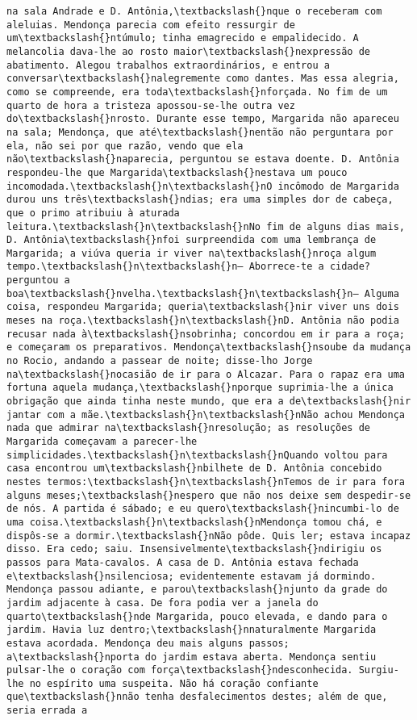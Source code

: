\begin{Verbatim}[commandchars=\\\{\}]
na sala Andrade e D. Antônia,\textbackslash{}nque o receberam com aleluias. Mendonça parecia com efeito ressurgir de um\textbackslash{}ntúmulo; tinha emagrecido e empalidecido. A melancolia dava-lhe ao rosto maior\textbackslash{}nexpressão de abatimento. Alegou trabalhos extraordinários, e entrou a conversar\textbackslash{}nalegremente como dantes. Mas essa alegria, como se compreende, era toda\textbackslash{}nforçada. No fim de um quarto de hora a tristeza apossou-se-lhe outra vez do\textbackslash{}nrosto. Durante esse tempo, Margarida não apareceu na sala; Mendonça, que até\textbackslash{}nentão não perguntara por ela, não sei por que razão, vendo que ela não\textbackslash{}naparecia, perguntou se estava doente. D. Antônia respondeu-lhe que Margarida\textbackslash{}nestava um pouco incomodada.\textbackslash{}n\textbackslash{}nO incômodo de Margarida durou uns três\textbackslash{}ndias; era uma simples dor de cabeça, que o primo atribuiu à aturada leitura.\textbackslash{}n\textbackslash{}nNo fim de alguns dias mais, D. Antônia\textbackslash{}nfoi surpreendida com uma lembrança de Margarida; a viúva queria ir viver na\textbackslash{}nroça algum tempo.\textbackslash{}n\textbackslash{}n— Aborrece-te a cidade? perguntou a boa\textbackslash{}nvelha.\textbackslash{}n\textbackslash{}n— Alguma coisa, respondeu Margarida; queria\textbackslash{}nir viver uns dois meses na roça.\textbackslash{}n\textbackslash{}nD. Antônia não podia recusar nada à\textbackslash{}nsobrinha; concordou em ir para a roça; e começaram os preparativos. Mendonça\textbackslash{}nsoube da mudança no Rocio, andando a passear de noite; disse-lho Jorge na\textbackslash{}nocasião de ir para o Alcazar. Para o rapaz era uma fortuna aquela mudança,\textbackslash{}nporque suprimia-lhe a única obrigação que ainda tinha neste mundo, que era a de\textbackslash{}nir jantar com a mãe.\textbackslash{}n\textbackslash{}nNão achou Mendonça nada que admirar na\textbackslash{}nresolução; as resoluções de Margarida começavam a parecer-lhe simplicidades.\textbackslash{}n\textbackslash{}nQuando voltou para casa encontrou um\textbackslash{}nbilhete de D. Antônia concebido nestes termos:\textbackslash{}n\textbackslash{}nTemos de ir para fora alguns meses;\textbackslash{}nespero que não nos deixe sem despedir-se de nós. A partida é sábado; e eu quero\textbackslash{}nincumbi-lo de uma coisa.\textbackslash{}n\textbackslash{}nMendonça tomou chá, e dispôs-se a dormir.\textbackslash{}nNão pôde. Quis ler; estava incapaz disso. Era cedo; saiu. Insensivelmente\textbackslash{}ndirigiu os passos para Mata-cavalos. A casa de D. Antônia estava fechada e\textbackslash{}nsilenciosa; evidentemente estavam já dormindo. Mendonça passou adiante, e parou\textbackslash{}njunto da grade do jardim adjacente à casa. De fora podia ver a janela do quarto\textbackslash{}nde Margarida, pouco elevada, e dando para o jardim. Havia luz dentro;\textbackslash{}nnaturalmente Margarida estava acordada. Mendonça deu mais alguns passos; a\textbackslash{}nporta do jardim estava aberta. Mendonça sentiu pulsar-lhe o coração com força\textbackslash{}ndesconhecida. Surgiu-lhe no espírito uma suspeita. Não há coração confiante que\textbackslash{}nnão tenha desfalecimentos destes; além de que, seria errada a 
\end{Verbatim}
